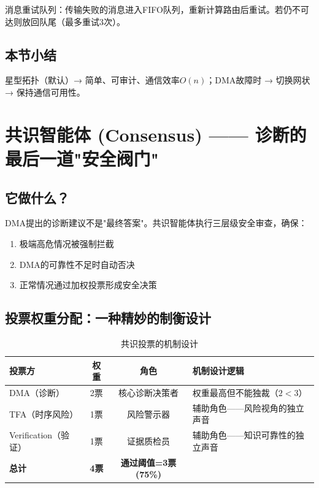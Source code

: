 \documentclass[11pt,a4paper]{ctexart}
\begin{document}
消息重试队列：传输失败的消息进入FIFO队列，重新计算路由后重试。若仍不可达则放回队尾（最多重试3次）。

\subsection{本节小结}

星型拓扑（默认）→ 简单、可审计、通信效率$O(n)$；DMA故障时 → 切换网状 → 保持通信可用性。

\newpage

\section{共识智能体 (Consensus) —— 诊断的最后一道"安全阀门"}

\subsection{它做什么？}

DMA提出的诊断建议不是"最终答案"。共识智能体执行三层级安全审查，确保：
\begin{enumerate}[nosep]
\item 极端高危情况被强制拦截
\item DMA的可靠性不足时自动否决
\item 正常情况通过加权投票形成安全决策
\end{enumerate}

\subsection{投票权重分配：一种精妙的制衡设计}

\begin{table}[H]
\centering
\small
\begin{tabular}{lccp{6cm}}
\toprule
\textbf{投票方} & \textbf{权重} & \textbf{角色} & \textbf{机制设计逻辑} \\
\midrule
DMA（诊断） & 2票 & 核心诊断决策者 & 权重最高但不能独裁（$2<3$）\\
TFA（时序风险） & 1票 & 风险警示器 & 辅助角色——风险视角的独立声音\\
Verification（验证） & 1票 & 证据质检员 & 辅助角色——知识可靠性的独立声音\\
\midrule
\textbf{总计} & \textbf{4票} & \textbf{通过阈值=3票(75\%)} & \\
\bottomrule
\end{tabular}
\caption{共识投票的机制设计}
\end{table}
\end{document}
